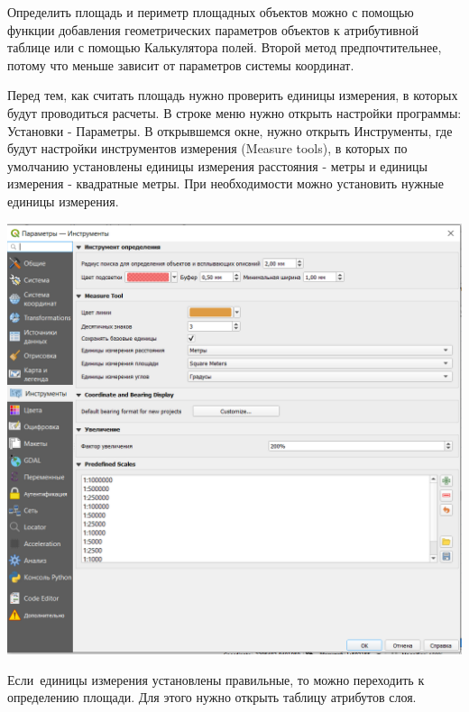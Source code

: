 \documentclass[
]{book}
\begin{document}
Определить площадь и периметр площадных объектов можно с помощью функции добавления геометрических параметров объектов к атрибутивной таблице или с помощью Калькулятора полей. Второй метод предпочтительнее, потому что меньше зависит от параметров системы координат.

Перед тем, как считать площадь нужно проверить единицы измерения, в которых будут проводиться расчеты. В строке меню нужно открыть настройки программы: Установки - Параметры. В открывшемся окне, нужно открыть Инструменты, где будут настройки инструментов измерения (Measure tools), в которых по умолчанию установлены единицы измерения расстояния - метры и единицы измерения - квадратные метры. При необходимости можно установить нужные единицы измерения.

\includegraphics{figures/40.PNG}

Если~единицы измерения установлены правильные, то можно переходить к определению площади. Для этого нужно открыть таблицу атрибутов слоя.
\end{document}
